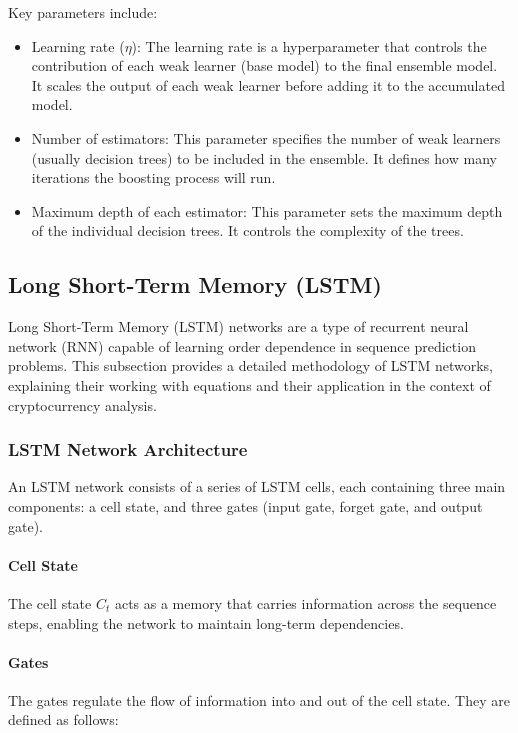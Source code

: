 Key parameters include:
\begin{itemize}
    \item Learning rate ($\eta$): The learning rate is a hyperparameter that controls the contribution of each weak learner (base model) to the final ensemble model. It scales the output of each weak learner before adding it to the accumulated model.
    \item Number of estimators: This parameter specifies the number of weak learners (usually decision trees) to be included in the ensemble. It defines how many iterations the boosting process will run.
    \item Maximum depth of each estimator: This parameter sets the maximum depth of the individual decision trees. It controls the complexity of the trees.
\end{itemize}

\subsection{Long Short-Term Memory (LSTM)}

Long Short-Term Memory (LSTM) networks are a type of recurrent neural network (RNN) capable of learning order dependence in sequence prediction problems. This subsection provides a detailed methodology of LSTM networks, explaining their working with equations and their application in the context of cryptocurrency analysis.

\subsubsection{LSTM Network Architecture}
An LSTM network consists of a series of LSTM cells, each containing three main components: a cell state, and three gates (input gate, forget gate, and output gate).

\paragraph{Cell State}
The cell state \(C_t\) acts as a memory that carries information across the sequence steps, enabling the network to maintain long-term dependencies.

\paragraph{Gates}
The gates regulate the flow of information into and out of the cell state. They are defined as follows:

